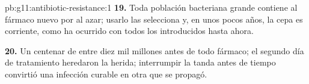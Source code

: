 \begin{solution}{pb:g11:antibiotic-resistance:1}
\textbf{19.} Toda población bacteriana grande contiene 
 al fármaco nuevo por  al azar; usarlo las
selecciona y, en unos pocos años, la cepa  es corriente, como
ha ocurrido con todos los  introducidos hasta ahora.

\textbf{20.} Un centenar de   entre diez mil millones
antes de todo fármaco; el segundo día de tratamiento heredaron la
herida; interrumpir la tanda antes de tiempo convirtió una infección
curable en otra  que se propagó.
\end{solution}
